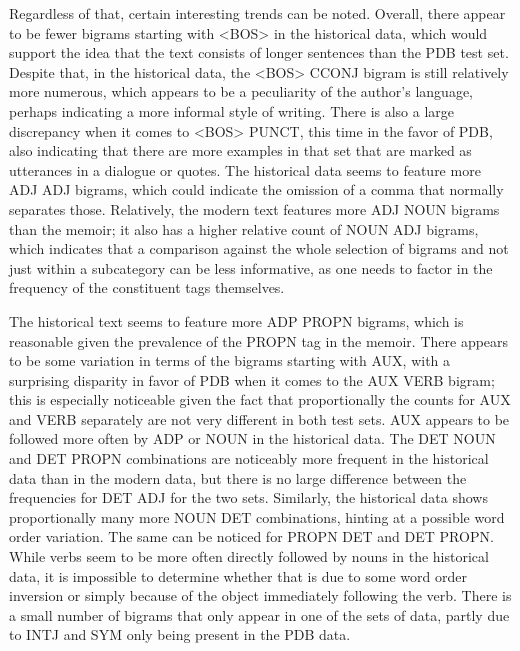 Regardless of that, certain interesting trends can be noted. Overall, there appear to be fewer bigrams starting with <BOS> in the historical data, which would support the idea that the text consists of longer sentences than the PDB test set. Despite that, in the historical data, the <BOS> CCONJ bigram is still relatively more numerous, which appears to be a peculiarity of the author's language, perhaps indicating a more informal style of writing. There is also a large discrepancy when it comes to <BOS> PUNCT, this time in the favor of PDB, also indicating that there are more examples in that set that are marked as utterances in a dialogue or quotes. The historical data seems to feature more ADJ ADJ bigrams, which could indicate the omission of a comma that normally separates those. Relatively, the modern text features more ADJ NOUN bigrams than the memoir; it also has a higher relative count of NOUN ADJ bigrams, which indicates that a comparison against the whole selection of bigrams and not just within a subcategory can be less informative, as one needs to factor in the frequency of the constituent tags themselves. 

The historical text seems to feature more ADP PROPN bigrams, which is reasonable given the prevalence of the PROPN tag in the memoir. There appears to be some variation in terms of the bigrams starting with AUX, with a surprising disparity in favor of PDB when it comes to the AUX VERB bigram; this is especially noticeable given the fact that proportionally the counts for AUX and VERB separately are not very different in both test sets. AUX appears to be followed more often by ADP or NOUN in the historical data. The DET NOUN and DET PROPN combinations are noticeably more frequent in the historical data than in the modern data, but there is no large difference between the frequencies for DET ADJ for the two sets. Similarly, the historical data shows proportionally many more NOUN DET combinations, hinting at a possible word order variation. The same can be noticed for PROPN DET and DET PROPN. While verbs seem to be more often directly followed by nouns in the historical data, it is impossible to determine whether that is due to some word order inversion or simply because of the object immediately following the verb. There is a small number of bigrams that only appear in one of the sets of data, partly due to INTJ and SYM only being present in the PDB data.

